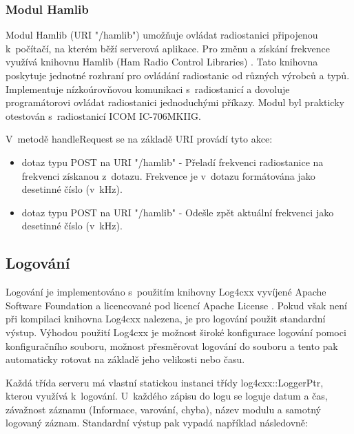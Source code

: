 \subsubsection{Modul Hamlib}

Modul Hamlib (URI "/hamlib") umožňuje ovládat radiostanici připojenou
k~počítačí, na kterém běží serverová aplikace.
Pro změnu a získání frekvence využívá knihovnu Hamlib (Ham Radio Control Libraries) \cite{hamlib}.
Tato knihovna poskytuje jednotné rozhraní pro ovládání radiostanic od různých výrobců a typů.
Implementuje nízkoúrovňovou komunikaci s~radiostanicí a dovoluje programátorovi ovládat 
radiostanici jednoduchými příkazy.
Modul byl prakticky otestován s~radiostanicí ICOM IC-706MKIIG.

V~metodě handleRequest se na základě URI provádí tyto akce:

\begin{itemize}
\item dotaz typu POST na URI "/hamlib" - Přeladí frekvenci radiostanice %
na frekvenci získanou z~dotazu. Frekvence
je v~dotazu formátována jako desetinné číslo (v~kHz).
\item dotaz typu POST na URI "/hamlib" - Odešle zpět aktuální frekvenci jako
desetinné číslo (v~kHz).
\end{itemize}



\subsection{Logování}
\label{implementace_logovani}

Logování je implementováno s~použitím knihovny Log4cxx vyvíjené Apache Software Foundation a licencované pod licencí
Apache License \cite{log4cxx}.  %
Pokud však není při kompilaci knihovna Log4cxx nalezena, je pro logování použit standardní výstup.
Výhodou použití Log4cxx je možnost široké konfigurace logování pomoci konfiguračního souboru, možnost přesměrovat
logování do souboru a tento pak automaticky rotovat na základě jeho velikosti nebo času.

Každá třída serveru má vlastní statickou instanci třídy log4cxx::LoggerPtr, kterou využívá k~logování.
U~každého zápisu do logu se loguje datum a čas, závažnost záznamu (Informace, varování, chyba), název modulu a samotný
logovaný záznam. Standardní výstup pak vypadá například následovně:

